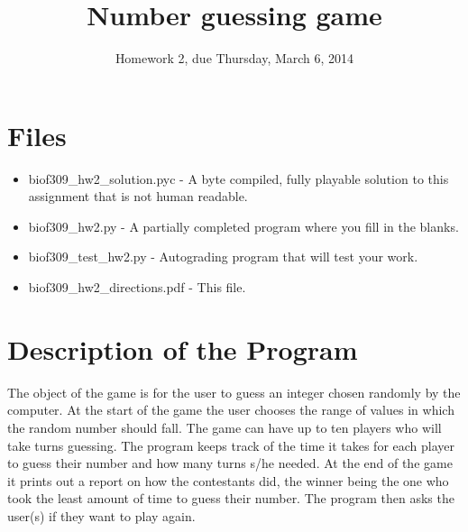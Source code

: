 \documentclass[11pt]{amsart}
\title{Number guessing game}
\author{Homework 2, due Thursday, March 6, 2014}
\begin{document}
\maketitle

\section*{Files}
\begin{itemize}
  \item biof309_hw2_solution.pyc -  A byte compiled, fully playable solution to this assignment that is not human readable.
  \item biof309_hw2.py - A partially completed program where you fill in the blanks.
  \item biof309_test_hw2.py - Autograding program that will test your work.
  \item biof309_hw2_directions.pdf - This file.
\end{itemize}

\section*{Description of the Program}
The object of the game is for the user to guess an integer chosen randomly by the computer. At the start of the game the user chooses the range of values in which the random number should fall. The game can have up to ten
players who will take turns guessing. The program keeps track of the time it takes for each
player to guess their number and how many turns s/he needed.  At the end of the game it prints
out a report on how the contestants did, the winner being the one who took the least amount of
time to guess their number. The program then asks the user(s) if they want to play again.
\end{document}
